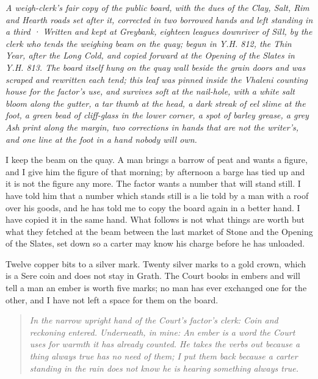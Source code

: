 \documentclass{design/chronicle}
\begin{document}
\clearpage{}
{\centering\FellFont\itshape\footnotesize\color{faded} A weigh-clerk’s fair copy of the public board, with the dues of the Clay, Salt, Rim and Hearth roads set after it, corrected in two borrowed hands and left standing in a third · Written and kept at Greybank, eighteen leagues downriver of Sill, by the clerk who tends the weighing beam on the quay; begun in Y.H. 812, the Thin Year, after the Long Cold, and copied forward at the Opening of the Slates in Y.H. 813. The board itself hung on the quay wall beside the grain doors and was scraped and rewritten each tend; this leaf was pinned inside the Vhaleni counting house for the factor’s use, and survives soft at the nail-hole, with a white salt bloom along the gutter, a tar thumb at the head, a dark streak of eel slime at the foot, a green bead of cliff-glass in the lower corner, a spot of barley grease, a grey Ash print along the margin, two corrections in hands that are not the writer’s, and one line at the foot in a hand nobody will own.\par}\medskip
I keep the beam on the quay. A man brings a barrow of peat and wants a figure, and I give him the figure of that morning; by afternoon a barge has tied up and it is not the figure any more. The factor wants a number that will stand still. I have told him that a number which stands still is a lie told by a man with a roof over his goods, and he has told me to copy the board again in a better hand. I have copied it in the same hand. What follows is not what things are worth but what they fetched at the beam between the last market of Stone and the Opening of the Slates, set down so a carter may know his charge before he has unloaded.

Twelve copper bits to a silver mark. Twenty silver marks to a gold crown, which is a Sere coin and does not stay in Grath. The Court books in embers and will tell a man an ember is worth five marks; no man has ever exchanged one for the other, and I have not left a space for them on the board.

\begin{quote}\itshape \emph{In the narrow upright hand of the Court’s factor’s clerk:} Coin and reckoning entered. \emph{Underneath, in mine:} An ember is a word the Court uses for warmth it has already counted. He takes the verbs out because a thing always true has no need of them; I put them back because a carter standing in the rain does not know he is hearing something always true.\end{quote}
\end{document}
